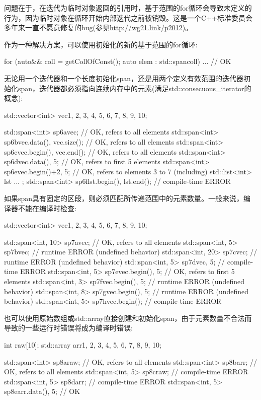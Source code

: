问题在于，在迭代为临时对象返回的引用时，基于范围的for循环会导致未定义的行为，因为临时对象在循环开始内部迭代之前被销毁。这是一个C++标准委员会多年来一直不愿意修复的bug(参见\url{http://wg21.link/p2012})。

作为一种解决方案，可以使用初始化的新的基于范围的for循环:

\begin{cpp}
for (auto&& coll = getCollOfConst(); auto elem : std::span{coll}) ... // OK
\end{cpp}

无论用一个迭代器和一个长度初始化span，还是用两个定义有效范围的迭代器初始化span，迭代器都必须指向连续内存中的元素(满足std::consecuous\_iterator的概念):

\begin{cpp}
std::vector<int> vec{1, 2, 3, 4, 5, 6, 7, 8, 9, 10};

std::span<int> sp6a{vec}; // OK, refers to all elements
std::span<int> sp6b{vec.data(), vec.size()}; // OK, refers to all elements
std::span<int> sp6c{vec.begin(), vec.end()}; // OK, refers to all elements
std::span<int> sp6d{vec.data(), 5}; // OK, refers to first 5 elements
std::span<int> sp6e{vec.begin()+2, 5}; // OK, refers to elements 3 to 7 (including)
std::list<int> lst{ ... };
std::span<int> sp6f{lst.begin(), lst.end()}; // compile-time ERROR
\end{cpp}

如果span具有固定的区段，则必须匹配所传递范围中的元素数量。一般来说，编译器不能在编译时检查:

\begin{cpp}
std::vector<int> vec{1, 2, 3, 4, 5, 6, 7, 8, 9, 10};

std::span<int, 10> sp7a{vec}; // OK, refers to all elements
std::span<int, 5> sp7b{vec}; // runtime ERROR (undefined behavior)
std::span<int, 20> sp7c{vec}; // runtime ERROR (undefined behavior)
std::span<int, 5> sp7d{vec, 5}; // compile-time ERROR
std::span<int, 5> sp7e{vec.begin(), 5}; // OK, refers to first 5 elements
std::span<int, 3> sp7f{vec.begin(), 5}; // runtime ERROR (undefined behavior)
std::span<int, 8> sp7g{vec.begin(), 5}; // runtime ERROR (undefined behavior)
std::span<int, 5> sp7h{vec.begin()}; // compile-time ERROR
\end{cpp}

也可以使用原始数组或std::array直接创建和初始化span，由于元素数量不合法而导致的一些运行时错误将成为编译时错误:

\begin{cpp}
int raw[10];
std::array arr{1, 2, 3, 4, 5, 6, 7, 8, 9, 10};

std::span<int> sp8a{raw}; // OK, refers to all elements
std::span<int> sp8b{arr}; // OK, refers to all elements
std::span<int, 5> sp8c{raw}; // compile-time ERROR
std::span<int, 5> sp8d{arr}; // compile-time ERROR
std::span<int, 5> sp8e{arr.data(), 5}; // OK
\end{cpp}

